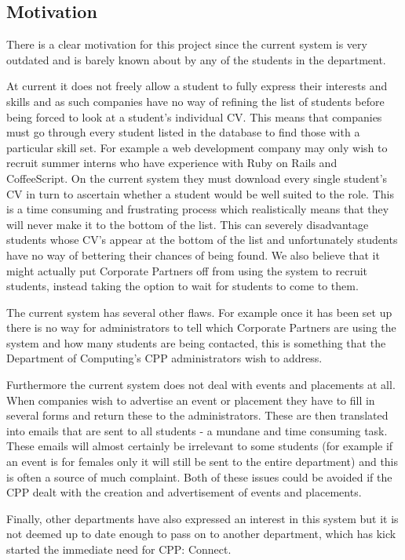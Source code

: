 \subsection{Motivation}
  There is a clear motivation for this project since the current system is very outdated and is barely known about by any of the students in the department.
  
  At current it does not freely allow a student to fully express their interests and skills and as such companies have no way of refining the list of students before being forced to look at a student's individual CV. This means that companies must go through every student listed in the database to find those with a particular skill set. For example a web development company may only wish to recruit summer interns who have experience with Ruby on Rails and CoffeeScript. On the current system they must download every single student's CV in turn to ascertain whether a student would be well suited to the role. This is a time consuming and frustrating process which realistically means that they will never make it to the bottom of the list. This can severely disadvantage students whose CV's appear at the bottom of the list and unfortunately students have no way of bettering their chances of being found.
  We also believe that it might actually put Corporate Partners off from using the system to recruit students, instead taking the option to wait for students to come to them.

  The current system has several other flaws. For example once it has been set up there is no way for administrators to tell which Corporate Partners are using the system and how many students are being contacted, this is something that the Department of Computing's CPP administrators wish to address. 

  Furthermore the current system does not deal with events and placements at all. When companies wish to advertise an event or placement they have to fill in several forms and return these to the administrators. These are then translated into emails that are sent to all students - a mundane and time consuming task. These emails will almost certainly be irrelevant to some students (for example if an event is for females only it will still be sent to the entire department) and this is often a source of much complaint. 
  Both of these issues could be avoided if the CPP dealt with the creation and advertisement of events and placements.

  Finally, other departments have also expressed an interest in this system but it is not deemed up to date enough to pass on to another department, which has kick started the immediate need for CPP: Connect.
